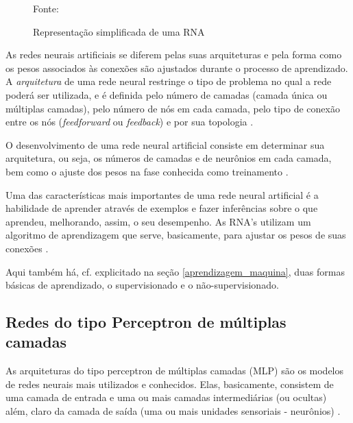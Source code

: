 \begin{figure}[H]
	\centering
	\caption{Representação simplificada de uma RNA}	

	{\scriptsize 	Fonte: }
	\label{fig:rna}
\end{figure}

As  redes  neurais  artificiais  se  diferem  pelas  suas arquiteturas e pela forma como os pesos associados às conexões são ajustados durante o processo de aprendizado. A \textit{arquitetura} de uma rede neural restringe o tipo de problema no qual a rede poderá ser utilizada, e é definida pelo  número  de  camadas  (camada única  ou múltiplas camadas), pelo número de nós em cada camada, pelo tipo de conexão entre os nós (\textit{feedforward} ou \textit{feedback}) e por sua topologia \cite[p. 46-49]{haykin_redes_2001}.

O desenvolvimento de uma rede neural artificial consiste em determinar sua arquitetura, ou seja, os números de camadas e de neurônios em cada camada, bem como o ajuste dos pesos na fase conhecida como treinamento \cite{hagan_neural_1996, haykin_redes_2001}.

Uma das características mais importantes de uma rede neural artificial é a habilidade de aprender através de exemplos e fazer inferências sobre o que aprendeu, melhorando, assim, o seu desempenho. As RNA's utilizam um algoritmo de aprendizagem que serve, basicamente, para ajustar os pesos de suas conexões \cite{haykin_redes_2001, ferneda_redes_2006, lima_ia_2016, Norvig2013}. 

Aqui também há, cf. explicitado na seção \ref{aprendizagem_maquina}, duas formas básicas de aprendizado, o supervisionado e o não-supervisionado.

\subsection{Redes do tipo Perceptron de múltiplas camadas}
As arquiteturas do tipo perceptron de múltiplas camadas (MLP) são os modelos de redes neurais mais utilizados e conhecidos. Elas, basicamente, consistem de uma camada de entrada e uma ou mais camadas intermediárias (ou ocultas) além, claro da camada de saída (uma ou mais unidades sensoriais - neurônios) \cite{haykin_redes_2001}.

